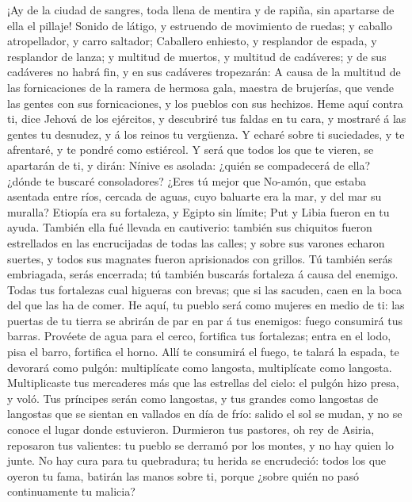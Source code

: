  ¡Ay de la ciudad de sangres, toda llena de mentira y de
rapiña, sin apartarse de ella el pillaje!  Sonido de
látigo, y estruendo de movimiento de ruedas; y caballo atropellador, y
carro saltador;  Caballero enhiesto, y resplandor de
espada, y resplandor de lanza; y multitud de muertos, y multitud de
cadáveres; y de sus cadáveres no habrá fin, y en sus cadáveres
tropezarán:  A causa de la multitud de las fornicaciones
de la ramera de hermosa gala, maestra de brujerías, que vende las gentes
con sus fornicaciones, y los pueblos con sus hechizos. 
Heme aquí contra ti, dice Jehová de los ejércitos, y descubriré tus
faldas en tu cara, y mostraré á las gentes tu desnudez, y á los reinos
tu vergüenza.  Y echaré sobre ti suciedades, y te
afrentaré, y te pondré como estiércol.  Y será que todos
los que te vieren, se apartarán de ti, y dirán: Nínive es asolada:
¿quién se compadecerá de ella? ¿dónde te buscaré consoladores?
 ¿Eres tú mejor que No-amón, que estaba asentada entre
ríos, cercada de aguas, cuyo baluarte era la mar, y del mar su muralla?
 Etiopía era su fortaleza, y Egipto sin límite; Put y
Libia fueron en tu ayuda.  También ella fué llevada en
cautiverio: también sus chiquitos fueron estrellados en las encrucijadas
de todas las calles; y sobre sus varones echaron suertes, y todos sus
magnates fueron aprisionados con grillos.  Tú también
serás embriagada, serás encerrada; tú también buscarás fortaleza á causa
del enemigo.  Todas tus fortalezas cual higueras con
brevas; que si las sacuden, caen en la boca del que las ha de comer.
 He aquí, tu pueblo será como mujeres en medio de ti: las
puertas de tu tierra se abrirán de par en par á tus enemigos: fuego
consumirá tus barras.  Provéete de agua para el cerco,
fortifica tus fortalezas; entra en el lodo, pisa el barro, fortifica el
horno.  Allí te consumirá el fuego, te talará la espada,
te devorará como pulgón: multiplícate como langosta, multiplícate como
langosta.  Multiplicaste tus mercaderes más que las
estrellas del cielo: el pulgón hizo presa, y voló.  Tus
príncipes serán como langostas, y tus grandes como langostas de
langostas que se sientan en vallados en día de frío: salido el sol se
mudan, y no se conoce el lugar donde estuvieron. 
Durmieron tus pastores, oh rey de Asiria, reposaron tus valientes: tu
pueblo se derramó por los montes, y no hay quien lo junte.
 No hay cura para tu quebradura; tu herida se encrudeció:
todos los que oyeron tu fama, batirán las manos sobre ti, porque ¿sobre
quién no pasó continuamente tu malicia?

